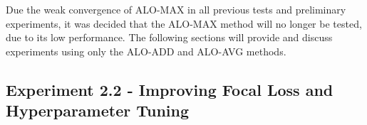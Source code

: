 %   


Due the weak convergence of ALO-MAX in all previous tests and preliminary experiments, it was decided that the ALO-MAX method will no longer be tested, due to its low performance.
The following sections will provide and discuss experiments using only the ALO-ADD and ALO-AVG methods.

\subsection{Experiment 2.2 - Improving Focal Loss and Hyperparameter Tuning}
\label{ssec:bsds_subexp2}

